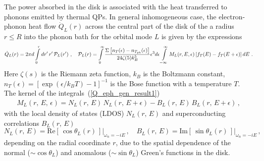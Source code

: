 \documentclass[prx,twocolumn,aps,superscriptaddress,showpacs,amsmath,amssymb,footnoteinbib]{revtex4-1}
\begin{document}
\begin{widetext}
The power absorbed in the disk is associated with the heat
transferred to phonons emitted by thermal QPs. In general
inhomogeneous case, the electron-phonon heat flow $\dot{Q}_L(r)$
across the central part of the disk of the a radius $r \le R$ into
the phonon bath for the orbital mode $L$ is given by the
expressions~\cite{Timofeev-prl09,Maisi-prl13} %
%
\begin{eqnarray}
   \dot{Q}_L(r) = 2 \pi d \int\limits_0^r d r'\, r'\, \mathcal{P}_L(r') \ , \label{Q_eph_gen_result1}  \quad
   \mathcal{P}_L(r) =  \int\limits_{0}^{\infty}\frac{\Sigma \left[ n_T(\epsilon)
            - n_{T_{\rm ph}}(\epsilon)\right]}{24 \zeta(5) k_B^5}\epsilon^3  d\epsilon \int\limits_{-\infty}^{\infty}
            M_L(r,E,\epsilon) \left[ f_T(E) - f_T(E+\epsilon)\right] dE \ .
\end{eqnarray}
%
Here $\zeta(s)$ is the Riemann zeta function, $k_B$ is the
Boltzmann constant, $n_{T}(\epsilon)=[\exp(\epsilon/k_B
T)-1]^{-1}$ is the Bose function with a temperature $T$. The
kernel of the integrals~(\ref{Q_eph_gen_result1})%
%
\begin{eqnarray}\label{M-function}
    M_L(r,\,E,\,\epsilon) = N_L(r,\,E)\,N_L(r,\,E+\epsilon)
            - B_L(r,\,E)\,B_L(r,\,E+\epsilon)\,,
\end{eqnarray}
%
with the local density of states (LDOS) $N_L(r,\,E)$ and superconducting correlations $B_L(r,\,E)$
%
\begin{equation}\label{N_L-B_L}
    N_L(r,\,E) = \left.\mathrm{Re} [\,\cos\theta_L(r)\,]\right|_{\omega_n = - i
    E}\,,\quad
    B_L(r,\,E) = \left.\mathrm{Im}[\,\sin\theta_L(r)\,]\right|_{\omega_n = - i E}\,,
\end{equation}
%
depending on the radial coordinate $r$, due to the spatial dependence
of the normal ($\sim\cos\theta_L$) and anomalous
($\sim\sin\theta_L$) Green's functions in the disk.
\end{widetext}
\end{document}
